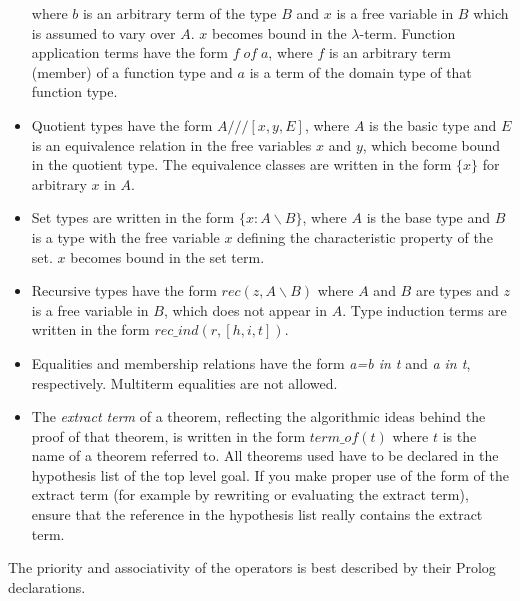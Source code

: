 \documentclass[11pt]{report}
\begin{document}
\begin{itemize}
 where $b$ is an arbitrary term of the type $B$ and $x$ is a
 free variable in $B$ which is assumed to vary over $A$. $x$ 
 becomes bound in the $\lambda$-term.
 Function application terms have the form $f\; of\; a$, where
 $f$ is an arbitrary term (member) of a function type and 
 $a$ is a term of the domain type of that function type.
 \item
 Quotient types have the form \hbox{$A///[x,y,E]$}, where $A$ is the
 basic type and $E$ is an equivalence relation in the free variables
 $x$ and $y$, which become bound in the quotient type. The equivalence
 classes are written in the form $\{x\}$ for arbitrary $x$ in $A$.
 \item
 Set types are written in the form $\{x:A\backslash B\}$, where
 $A$ is the base type and $B$ is a type with the free variable $x$
 defining the characteristic property of the set. $x$ becomes bound
 in the set term.
 \item
 Recursive types have the form $rec(z,A\backslash B)$ 
 where $A$ and $B$ are types and 
 $z$ is a free variable in $B$, which does not appear in $A$.
 Type induction terms are written in the form
 \hbox{$rec\_ind(r,[h,i,t])$}.
 \item
 Equalities and membership relations have the form \emph{a=b in t} and 
 \emph{a in t}, respectively.
 Multiterm equalities are not allowed.
 \item
 The \emph{extract term} of a theorem, reflecting the algorithmic ideas
 behind the proof of that theorem, is written in the form
 $term\_of(t)$ where $t$ is the name of a theorem referred to.
 All theorems used have to be declared in the hypothesis 
 list of the top level goal. If you make proper use of the form
 of the extract term (for example by rewriting or evaluating the
 extract term), ensure that the reference in the hypothesis list
 really contains the extract term.
 \end{itemize}
 The priority and associativity of the operators is best described
 by their Prolog declarations.
  
\end{document}
